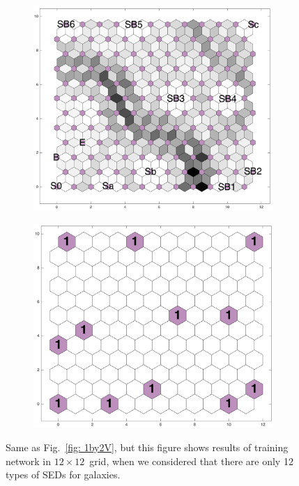     \begin{figure}
        \begin{subfigure}[b]{0.5\textwidth}
            \centering
            \includegraphics[width=\textwidth]{../images0.01/2d/dist_12_by_12.png}
        \end{subfigure}
        \hfill
        \begin{subfigure}[b]{0.5\textwidth}
            \includegraphics[width=\textwidth]{../images0.01/2d/hit_t_12_by_12.png}
        \end{subfigure}
        \caption{Same as Fig.~\ref{fig: 1by2V}, but this figure shows results of training network in $12\times12$~grid, when we considered that there are only 12 types of SEDs for galaxies.}
        \label{fig: 12by12T_newsom}
    \end{figure}
    
